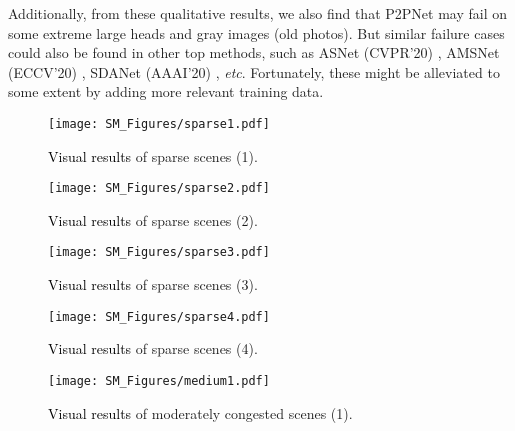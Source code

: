 \documentclass[10pt,twocolumn,letterpaper]{article}
\newcommand{\ywu}[1]{\textcolor{black}{#1}}
\begin{document}
Additionally, from these qualitative results, we also find that P2PNet may fail on some extreme large heads and gray images (old photos). But similar failure cases could also be found in other top
methods, such as ASNet (CVPR’20) \cite{jiang2020attention}, AMSNet (ECCV’20) \cite{hu2020count}, SDANet (AAAI’20) \cite{miao2020shallow}, \textit{etc}. Fortunately, these might be alleviated to some extent by adding more relevant training data.

\begin{figure*}[t!] 
\vspace{-1.0em}
  \centering
  \texttt{[image: SM\_Figures/sparse1.pdf]}
  \caption{\ywu{Visual results} of sparse scenes (1).}
  \label{supp_fig1} 
  \vspace{-1.5em}
\end{figure*}

\begin{figure*}[t!] 
\vspace{-1.0em}
  \centering
  \texttt{[image: SM\_Figures/sparse2.pdf]}
  \caption{\ywu{Visual results} of sparse scenes (2).}
  \label{supp_fig2} 
  \vspace{-1.5em}
\end{figure*}

\begin{figure*}[t!] 
\vspace{-1.0em}
  \centering
  \texttt{[image: SM\_Figures/sparse3.pdf]}
  \caption{\ywu{Visual results} of sparse scenes (3).}
  \label{supp_fig3} 
  \vspace{-1.5em}
\end{figure*}

\begin{figure*}[t!] 
\vspace{-1.0em}
  \centering
  \texttt{[image: SM\_Figures/sparse4.pdf]}
  \caption{\ywu{Visual results} of sparse scenes (4).}
  \label{supp_fig4} 
  \vspace{-1.5em}
\end{figure*}



\begin{figure*}[t!] 
\vspace{-1.0em}
  \centering
  \texttt{[image: SM\_Figures/medium1.pdf]}
  \caption{\ywu{Visual results} of moderately congested scenes (1).}
  \label{supp_fig5} 
  \vspace{-1.5em}
\end{figure*}
\end{document}
